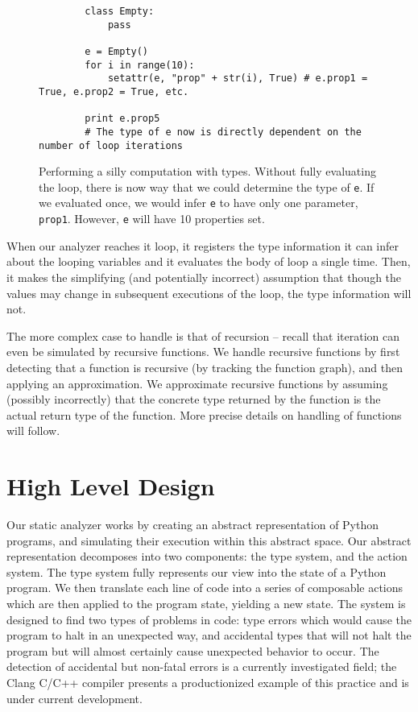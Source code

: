 \documentclass{article}[12pt]
\begin{document}
\begin{figure}
    \begin{verbatim}
        class Empty:
            pass

        e = Empty()
        for i in range(10):
            setattr(e, "prop" + str(i), True) # e.prop1 = True, e.prop2 = True, etc.

        print e.prop5
        # The type of e now is directly dependent on the number of loop iterations
    \end{verbatim}
    \caption{Performing a silly computation with types. Without fully evaluating the loop, there is now
        way that we could determine the type of \texttt{e}. If we evaluated once, we would infer
        \texttt{e} to have only one parameter, \texttt{prop1}. However, \texttt{e} will have 10
        properties set.  
     } 
     \label{fig:cantignoreloops}
 \end{figure}
When our analyzer reaches it loop, it registers the type information it can infer about the looping
variables and it evaluates the body of loop a single time. Then, it makes the simplifying (and
potentially incorrect) assumption that though the values may change in subsequent executions of the
loop, the type information will not.

The more complex case to handle is that of recursion -- recall that iteration can even be simulated
by recursive functions. We handle recursive functions by first detecting that a function is
recursive (by tracking the function graph), and then applying an approximation. We approximate
recursive functions by assuming (possibly incorrectly) that the concrete type returned by the
function is the actual return type of the function. More precise details on handling of functions
will follow.

\section{High Level Design}
  Our static analyzer works by creating an abstract representation of Python programs, and simulating
  their execution within this abstract space. Our abstract representation decomposes into two
  components: the type system, and the action system. The type system fully represents our view into the state of a
  Python program. We then translate each line of code into a series of composable actions 
  which are then applied to the program state, yielding a new state. The system is designed to find two types of problems
  in code: type errors which would cause the program to halt in an unexpected way, and accidental
  types that will not halt the program but will almost certainly cause unexpected behavior to occur. The detection of
  accidental but non-fatal errors is a currently investigated field; the Clang C/C++ compiler presents a productionized
  example of this practice and is under current development.
\end{document}
